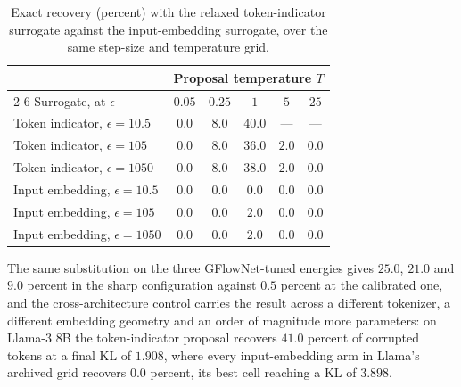 \begin{table}[htbp]
    \centering
    \small
    \begin{tabular}{lccccc}
        \toprule
        & \multicolumn{5}{c}{Proposal temperature $T$} \\
        \cmidrule(lr){2-6}
        Surrogate, at $\epsilon$ & $0.05$ & $0.25$ & $1$ & $5$ & $25$ \\
        \midrule
        Token indicator, $\epsilon = 10.5$      & $0.0$ & $8.0$ & $\mathbf{40.0}$ & --- & --- \\
        Token indicator, $\epsilon = 105$       & $0.0$ & $8.0$ & $\mathbf{36.0}$ & $2.0$ & $0.0$ \\
        Token indicator, $\epsilon = 1050$      & $0.0$ & $8.0$ & $\mathbf{38.0}$ & $2.0$ & $0.0$ \\
        \midrule
        Input embedding, $\epsilon = 10.5$  & $0.0$ & $0.0$ & $0.0$ & $0.0$ & $0.0$ \\
        Input embedding, $\epsilon = 105$   & $0.0$ & $0.0$ & $2.0$ & $0.0$ & $0.0$ \\
        Input embedding, $\epsilon = 1050$  & $0.0$ & $0.0$ & $2.0$ & $0.0$ & $0.0$ \\
        \bottomrule
    \end{tabular}
    \caption[Exact recovery for the two surrogates over the same sweep.]{Exact recovery (percent) with the relaxed token-indicator surrogate against the input-embedding surrogate, over the same step-size and temperature grid.}
    \label{tab:onehot-sweep}
\end{table}

The same substitution on the three GFlowNet-tuned energies gives $25.0$, $21.0$ and $9.0$ percent in the sharp configuration against $0.5$ percent at the calibrated one, and the cross-architecture control carries the result across a different tokenizer, a different embedding geometry and an order of magnitude more parameters: on Llama-3 8B the token-indicator proposal recovers $41.0$ percent of corrupted tokens at a final KL of $1.908$, where every input-embedding arm in Llama's archived grid recovers $0.0$ percent, its best cell reaching a KL of $3.898$.

